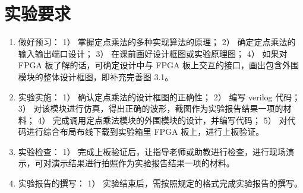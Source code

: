 \documentclass[AutoFakeBold]{LZUThesis}
\begin{document}
\section{实验要求}
\begin{enumerate}
    \item 做好预习：
    1） 掌握定点乘法的多种实现算法的原理；
    2） 确定定点乘法的输入输出端口设计；
    3） 在课前画好设计框图或实验原理图；
    4） 如果对 FPGA 板了解的话，可确定设计中与 FPGA 板上交互的接口，画出包含外围模块的整体设计框图，即补充完善图 3.1。
    \item 实验实施：
    1） 确认定点乘法的设计框图的正确性；
    2） 编写 verilog 代码；
    3） 对该模块进行仿真，得出正确的波形，截图作为实验报告结果一项的材料；
    4） 完成调用定点乘法模块的外围模块的设计，并编写代码；
    5） 对代码进行综合布局布线下载到实验箱里 FPGA 板上，进行上板验证。
    \item 实验检查：
    1） 完成上板验证后，让指导老师或助教进行检查，进行现场演示，可对演示结果进行拍照作为实验报告结果一项的材料。
    \item 实验报告的撰写：
    1） 实验结束后，需按照规定的格式完成实验报告的撰写。
\end{enumerate}
\end{document}
